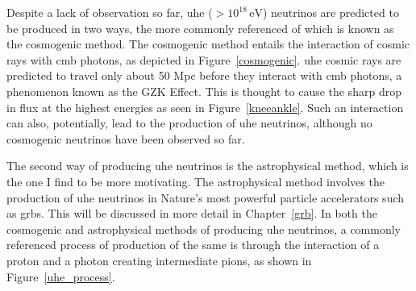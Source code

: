 Despite a lack of observation so far, \gls{uhe} ($>10^{18}\,\mbox{eV}$) neutrinos are predicted to be produced in two ways, the more commonly referenced of which is known as the cosmogenic method. The cosmogenic method entails the interaction of cosmic rays with \gls{cmb} photons, as depicted in Figure~\ref{cosmogenic}. \gls{uhe} cosmic rays are predicted to travel only about 50 Mpc before they interact with \gls{cmb} photons, a phenomenon known as the GZK Effect. This is thought to cause the sharp drop in flux at the highest energies as seen in Figure~\ref{kneeankle}. Such an interaction can also, potentially, lead to the production of \gls{uhe} neutrinos, although no cosmogenic neutrinos have been observed so far. 

The second way of producing \gls{uhe} neutrinos is the astrophysical method, which is the one I find to be more motivating.
The astrophysical method involves the production of \gls{uhe} neutrinos in Nature's most powerful particle accelerators such as \gls{grbs}. This will be discussed in more detail in Chapter~\ref{grb}. In both the cosmogenic and astrophysical methods of producing \gls{uhe} neutrinos, a commonly referenced process of production of the same is through the interaction of a proton and a photon creating intermediate pions, as shown in Figure~\ref{uhe_process}. 

